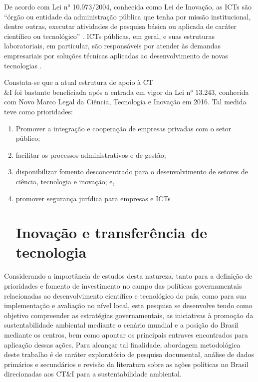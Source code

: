 De acordo com Lei n° 10.973/2004, conhecida como Lei de Inovação, as ICTs são “órgão ou entidade da administração pública que tenha por missão institucional, dentre outras, executar atividades de pesquisa básica ou aplicada de caráter científico ou tecnológico” \cite{brazil_l1097304_2004}. ICTs públicas, em geral, e suas estruturas laboratoriais, em particular, são responsáveis por atender às demandas empresariais por soluções técnicas aplicadas ao desenvolvimento de novas tecnologias \cite{turchi_politicas_2017}.

Constata-se que a atual estrutura de apoio à CT\\&I foi bastante beneficiada após a entrada em vigor da Lei n° 13.243, conhecida com Novo Marco Legal da Ciência, Tecnologia e Inovação em 2016. Tal medida teve como prioridades: 

\begin{enumerate}
   \item  Promover a integração e cooperação de empresas privadas com o setor público;
   \item facilitar os processos administrativos e de gestão;
   \item disponibilizar fomento desconcentrado para o desenvolvimento de setores de ciência, tecnologia e inovação; e,
   \item promover segurança jurídica para empresas e ICTs \section{Inovação e transferência de tecnologia}

 \end{enumerate}



Considerando a importância de estudos desta natureza, tanto para a definição de prioridades e fomento de investimento no campo das políticas governamentais relacionadas ao desenvolvimento científico e tecnológico do país, como para sua implementação e avaliação no nível local, esta pesquisa se desenvolve tendo como objetivo compreender as estratégias governamentais, as iniciativas à promoção da sustentabilidade ambiental mediante o cenário mundial e a posição do Brasil mediante os centros, bem como apontar os principais entraves encontrados para aplicação dessas ações. Para alcançar tal finalidade, abordagem metodológica deste trabalho é de caráter exploratório de pesquisa documental, análise de dados primários e secundários e revisão da literatura sobre as ações políticas no Brasil direcionadas aos CT\&I para a sustentabilidade ambiental.


